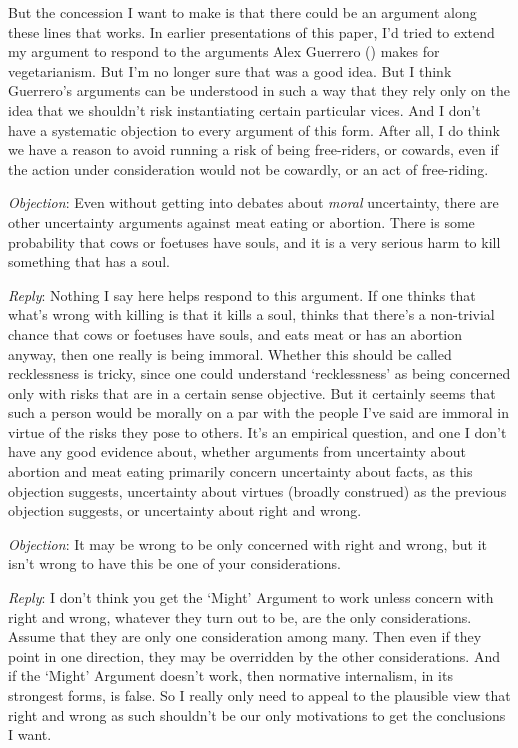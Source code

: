 \documentclass[
  10pt,
  letterpaper,
  DIV=11,
  numbers=noendperiod,
  twoside]{scrartcl}
\begin{document}
But the concession I want to make is that there could be an argument
along these lines that works. In earlier presentations of this paper,
I'd tried to extend my argument to respond to the arguments Alex
Guerrero () makes for vegetarianism.
But I'm no longer sure that was a good idea. But I think Guerrero's
arguments can be understood in such a way that they rely only on the
idea that we shouldn't risk instantiating certain particular vices. And
I don't have a systematic objection to every argument of this form.
After all, I do think we have a reason to avoid running a risk of being
free-riders, or cowards, even if the action under consideration would
not be cowardly, or an act of free-riding.

\emph{Objection}: Even without getting into debates about \emph{moral}
uncertainty, there are other uncertainty arguments against meat eating
or abortion. There is some probability that cows or foetuses have souls,
and it is a very serious harm to kill something that has a soul.

\emph{Reply}: Nothing I say here helps respond to this argument. If one
thinks that what's wrong with killing is that it kills a soul, thinks
that there's a non-trivial chance that cows or foetuses have souls, and
eats meat or has an abortion anyway, then one really is being immoral.
Whether this should be called recklessness is tricky, since one could
understand `recklessness' as being concerned only with risks that are in
a certain sense objective. But it certainly seems that such a person
would be morally on a par with the people I've said are immoral in
virtue of the risks they pose to others. It's an empirical question, and
one I don't have any good evidence about, whether arguments from
uncertainty about abortion and meat eating primarily concern uncertainty
about facts, as this objection suggests, uncertainty about virtues
(broadly construed) as the previous objection suggests, or uncertainty
about right and wrong.

\emph{Objection}: It may be wrong to be only concerned with right and
wrong, but it isn't wrong to have this be one of your considerations.

\emph{Reply}: I don't think you get the `Might' Argument to work unless
concern with right and wrong, whatever they turn out to be, are the only
considerations. Assume that they are only one consideration among many.
Then even if they point in one direction, they may be overridden by the
other considerations. And if the `Might' Argument doesn't work, then
normative internalism, in its strongest forms, is false. So I really
only need to appeal to the plausible view that right and wrong as such
shouldn't be our only motivations to get the conclusions I want.
\end{document}
